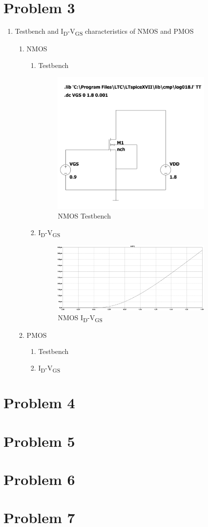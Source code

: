 \documentclass{article}
\begin{document}
\section{Problem 3}
\label{sec:org7be2c2d}
\begin{enumerate}
\item Testbench and I\textsubscript{D}-V\textsubscript{GS} characteristics of NMOS and PMOS
\begin{enumerate}
\item NMOS
\begin{enumerate}
\item Testbench
\begin{figure}[H]
\centering
\includegraphics[width=300px]{img/q3/a/nmos-testbench.pdf}
\caption{\label{fig:nmos-testbench}NMOS Testbench}
\end{figure}
\item I\textsubscript{D}-V\textsubscript{GS}
\begin{figure}[H]
\centering
\includegraphics[width=300px]{img/q3/a/nmos-id-vgs.pdf}
\caption{\label{fig:nmos-id-vgs}NMOS I\textsubscript{D}-V\textsubscript{GS}}
\end{figure}
\end{enumerate}
\item PMOS
\begin{enumerate}
\item Testbench
\item I\textsubscript{D}-V\textsubscript{GS}
\end{enumerate}
\end{enumerate}
\end{enumerate}
\section{Problem 4}
\label{sec:orgbdf368f}
\section{Problem 5}
\label{sec:org8788c18}
\section{Problem 6}
\label{sec:org01fe67a}
\section{Problem 7}
\label{sec:org4d77223}
\end{document}
